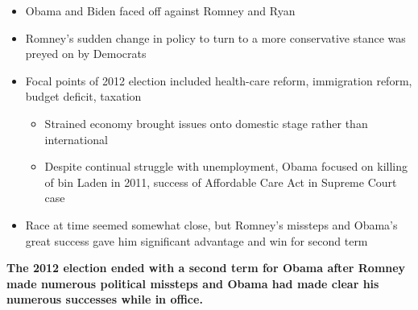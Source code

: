 \documentclass[a4paper]{article}
\begin{document}
    {
        \begin{itemize}
            \item Obama and Biden faced off against Romney and Ryan
            \item Romney's sudden change in policy to turn to a more conservative stance was preyed on by Democrats
            \item Focal points of 2012 election included health-care reform, immigration reform, budget deficit, taxation
            \begin{itemize}
                \item Strained economy brought issues onto domestic stage rather than international
                \item Despite continual struggle with unemployment, Obama focused on killing of bin Laden in 2011, success of Affordable Care Act in Supreme Court case
            \end{itemize}
            \item Race at time seemed somewhat close, but Romney's missteps and Obama's great success gave him significant advantage and win for second term
        \end{itemize}
        \textbf{The 2012 election ended with a second term for Obama after Romney made numerous political missteps and Obama had made clear his numerous successes while in office.}
    }
\end{document}
